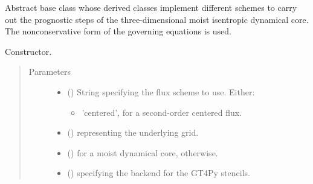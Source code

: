 \documentclass[letterpaper,10pt,english]{sphinxmanual}
\begin{document}
\begin{fulllineitems}
\label{\detokenize{api:dycore.prognostic_isentropic_nonconservative.PrognosticIsentropicNonconservative}}
Abstract base class whose derived classes implement different schemes to carry out the
prognostic steps of the three-dimensional moist isentropic dynamical core.
The nonconservative form of the governing equations is used.

\begin{fulllineitems}
\label{\detokenize{api:dycore.prognostic_isentropic_nonconservative.PrognosticIsentropicNonconservative.__init__}}
Constructor.
\begin{quote}\begin{description}
\item[{Parameters}] \leavevmode\begin{itemize}
\item {} 
 () \textendash{} 
String specifying the flux scheme to use. Either:
\begin{itemize}
\item {} 
’centered’, for a second-order centered flux.

\end{itemize}


\item {} 
 () \textendash{} {\hyperref[\detokenize{api:grids.grid_xyz.GridXYZ}]{}} representing the underlying grid.

\item {} 
 () \textendash{}  for a moist dynamical core,  otherwise.

\item {} 
 () \textendash{}  specifying the backend for the GT4Py stencils.


\end{itemize}
\end{description}
\end{quote}
\end{fulllineitems}
\end{fulllineitems}
\end{document}
